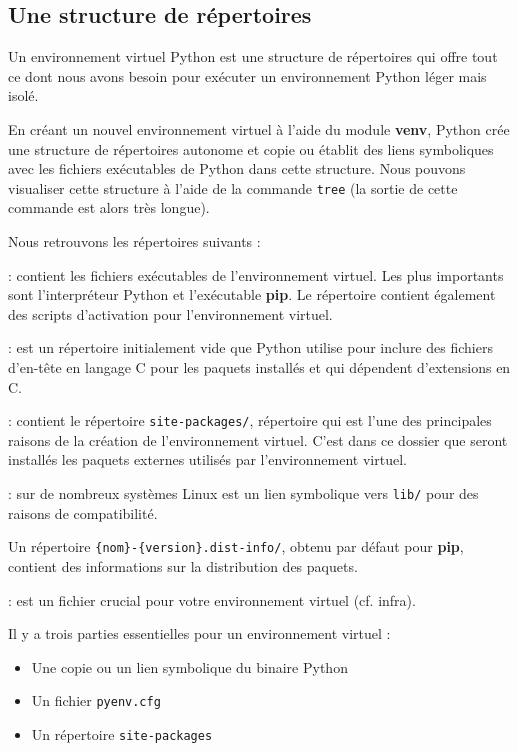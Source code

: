 \subsection*{Une structure de répertoires}
Un environnement virtuel Python est une structure de répertoires qui offre tout ce dont nous avons besoin pour exécuter un environnement Python léger mais isolé.

En créant un nouvel environnement virtuel à l'aide du module \textbf{venv}, Python crée une structure de répertoires autonome et copie ou établit des liens symboliques avec les fichiers exécutables de Python dans cette structure. Nous pouvons visualiser cette structure à l'aide de la commande \texttt{tree} (la sortie de cette commande est alors très longue). 

Nous retrouvons les répertoires suivants :

\begin{description}
    \item[bin/] : contient les fichiers exécutables de l'environnement virtuel. Les plus importants sont l'interpréteur Python et l'exécutable \textbf{pip}. Le répertoire contient également des scripts d'activation pour l'environnement virtuel.
    \item[include/] : est un répertoire initialement vide que Python utilise pour inclure des fichiers d'en-tête en langage C pour les paquets installés et qui dépendent d'extensions en C.
    \item[lib/] : contient le répertoire \texttt{site-packages/}, répertoire qui est l'une des principales raisons de la création de l'environnement virtuel. C'est dans ce dossier que seront installés les paquets externes utilisés par l'environnement virtuel. 
    \item[lib64/] : sur de nombreux systèmes Linux est un lien symbolique vers \texttt{lib/} pour des raisons de compatibilité.
    \item Un répertoire \verb|{nom}-{version}.dist-info/|, obtenu par défaut pour \textbf{pip}, contient des informations sur la distribution des paquets.
    \item[pyvenv.cfg] : est un fichier crucial pour votre environnement virtuel (cf. infra).
\end{description}

Il y a trois parties essentielles pour un environnement virtuel :

\begin{itemize}
    \item Une copie ou un lien symbolique du binaire Python
    \item Un fichier \texttt{pyenv.cfg}
    \item Un répertoire \texttt{site-packages}
\end{itemize}

